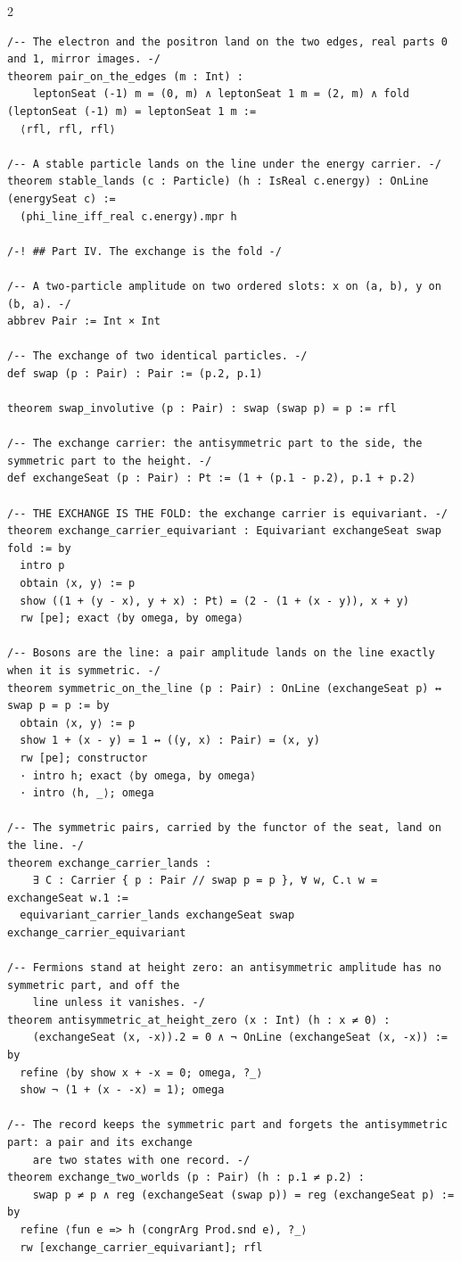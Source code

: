 \documentclass[10pt]{article}
\begin{document}
\begin{multicols}{2}
\begin{Verbatim}[fontsize=\fontsize{6.0}{6.9}\selectfont,breaklines,breakanywhere,breaksymbolleft={}]
/-- The electron and the positron land on the two edges, real parts 0 and 1, mirror images. -/
theorem pair_on_the_edges (m : Int) :
    leptonSeat (-1) m = (0, m) ∧ leptonSeat 1 m = (2, m) ∧ fold (leptonSeat (-1) m) = leptonSeat 1 m :=
  ⟨rfl, rfl, rfl⟩

/-- A stable particle lands on the line under the energy carrier. -/
theorem stable_lands (c : Particle) (h : IsReal c.energy) : OnLine (energySeat c) :=
  (phi_line_iff_real c.energy).mpr h

/-! ## Part IV. The exchange is the fold -/

/-- A two-particle amplitude on two ordered slots: x on (a, b), y on (b, a). -/
abbrev Pair := Int × Int

/-- The exchange of two identical particles. -/
def swap (p : Pair) : Pair := (p.2, p.1)

theorem swap_involutive (p : Pair) : swap (swap p) = p := rfl

/-- The exchange carrier: the antisymmetric part to the side, the symmetric part to the height. -/
def exchangeSeat (p : Pair) : Pt := (1 + (p.1 - p.2), p.1 + p.2)

/-- THE EXCHANGE IS THE FOLD: the exchange carrier is equivariant. -/
theorem exchange_carrier_equivariant : Equivariant exchangeSeat swap fold := by
  intro p
  obtain ⟨x, y⟩ := p
  show ((1 + (y - x), y + x) : Pt) = (2 - (1 + (x - y)), x + y)
  rw [pe]; exact ⟨by omega, by omega⟩

/-- Bosons are the line: a pair amplitude lands on the line exactly when it is symmetric. -/
theorem symmetric_on_the_line (p : Pair) : OnLine (exchangeSeat p) ↔ swap p = p := by
  obtain ⟨x, y⟩ := p
  show 1 + (x - y) = 1 ↔ ((y, x) : Pair) = (x, y)
  rw [pe]; constructor
  · intro h; exact ⟨by omega, by omega⟩
  · intro ⟨h, _⟩; omega

/-- The symmetric pairs, carried by the functor of the seat, land on the line. -/
theorem exchange_carrier_lands :
    ∃ C : Carrier { p : Pair // swap p = p }, ∀ w, C.ι w = exchangeSeat w.1 :=
  equivariant_carrier_lands exchangeSeat swap exchange_carrier_equivariant

/-- Fermions stand at height zero: an antisymmetric amplitude has no symmetric part, and off the
    line unless it vanishes. -/
theorem antisymmetric_at_height_zero (x : Int) (h : x ≠ 0) :
    (exchangeSeat (x, -x)).2 = 0 ∧ ¬ OnLine (exchangeSeat (x, -x)) := by
  refine ⟨by show x + -x = 0; omega, ?_⟩
  show ¬ (1 + (x - -x) = 1); omega

/-- The record keeps the symmetric part and forgets the antisymmetric part: a pair and its exchange
    are two states with one record. -/
theorem exchange_two_worlds (p : Pair) (h : p.1 ≠ p.2) :
    swap p ≠ p ∧ reg (exchangeSeat (swap p)) = reg (exchangeSeat p) := by
  refine ⟨fun e => h (congrArg Prod.snd e), ?_⟩
  rw [exchange_carrier_equivariant]; rfl


\end{Verbatim}
\end{multicols}
\end{document}
